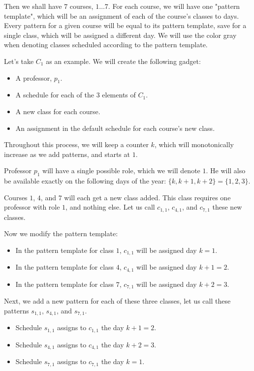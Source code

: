 Then we shall have $7$ courses, $1 \dots 7$. For each course, we will have one "pattern template", which will be an assignment of each of the course's classes to days. Every pattern for a given course will be equal to its pattern template, save for a single class, which will be assigned a different day. We will use the color {\color{gray}gray} when denoting classes scheduled according to the pattern template.

Let's take {\color{BrickRed}$C_1$} as an example. We will create the following gadget:
\begin{itemize}
\item A professor, $p_1$.
\item A schedule for each of the $3$ elements of {\color{BrickRed}$C_1$}.
\item A new class for each course.
\item An assignment in the default schedule for each course's new class.
\end{itemize}

Throughout this process, we will keep a counter $k$, which will monotonically increase as we add patterns, and starts at $1$.

Professor $p_1$ will have a single possible role, which we will denote $1$. He will also be available exactly on the following days of the year: $\{k, k + 1, k + 2\} = \{1, 2, 3\}$.

Courses $1$, $4$, and $7$ will each get a new class added. This class requires one professor with role $1$, and nothing else. Let us call $c_{1, 1}$, $c_{4, 1}$, and $c_{7, 1}$ these new classes.

Now we modify the pattern template:
\begin{itemize}
\item In the pattern template for class $1$, $c_{1, 1}$ will be assigned day $k = 1$.
\item In the pattern template for class $4$, $c_{4, 1}$ will be assigned day $k + 1 = 2$.
\item In the pattern template for class $7$, $c_{7, 1}$ will be assigned day $k + 2 = 3$.
\end{itemize}

Next, we add a new pattern for each of these three classes, let us call these patterns $s_{1, 1}$, $s_{4, 1}$, and $s_{7, 1}$.
\begin{itemize}
\item Schedule $s_{1, 1}$ assigns to $c_{1, 1}$ the day $k + 1 = 2$.
\item Schedule $s_{4, 1}$ assigns to $c_{4, 1}$ the day $k + 2 = 3$.
\item Schedule $s_{7, 1}$ assigns to $c_{7, 1}$ the day $k = 1$.
\end{itemize}

